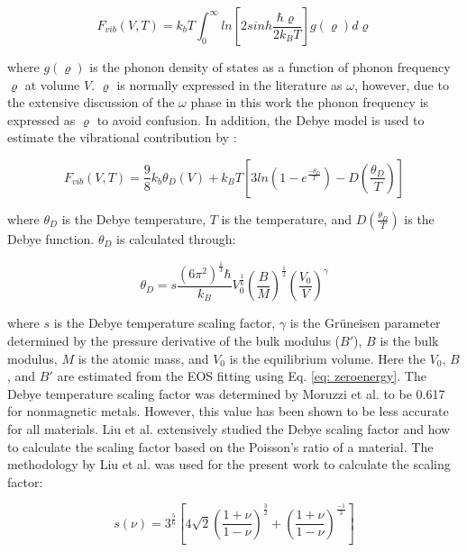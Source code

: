 \begin{equation}
\label{eq: phonon}
F_{vib}(V,T) = k_{b}T \int_{0}^{\infty} ln \left[ 2sinh \frac{\hbar \varrho}{2k_BT} \right] g(\varrho) d\varrho
\end{equation}

\noindent where $g(\varrho)$ is the phonon density of states as a function of phonon frequency $\varrho$ at volume $V$. $\varrho$ is normally expressed in the literature as $\omega$, however, due to the extensive discussion of the $\omega$ phase in this work the phonon frequency is expressed as $\varrho$ to avoid confusion. In addition, the Debye model is used to estimate the vibrational contribution by \cite{Shang2010}: 

\begin{equation}
\label{eq: debye}
F_{vib}(V,T) = \frac{9}{8} k_{b} \theta_{D}(V) + k_{B}T \left[ 3 ln \left( 1 - e^{\frac{-\theta_{D}}{T}} \right) - D \left( \frac{\theta_D}{T} \right) \right] 
\end{equation}

\noindent where $\theta_{D}$ is the Debye temperature, $T$ is the temperature, and $D \left( \frac{\theta_{D}}{T} \right) $ is the Debye function. $\theta_{D}$ is calculated through: 

\begin{equation}
\label{eq: debyetemp}
\theta_{D} = s \frac{(6\pi^2)^{\frac{1}{3}}\hbar}{k_B} V_{0}^{\frac{1}{6}} \left( \frac{B}{M} \right)^{\frac{1}{2}} \left( \frac{V_0}{V} \right)^{\gamma} 
\end{equation}

\noindent where $s$ is the Debye temperature scaling factor, $\gamma$ is the Gr\"uneisen parameter determined by the pressure derivative of the bulk modulus ($B'$), $B$ is the bulk modulus, $M$ is the atomic mass, and $V_0$ is the equilibrium volume. Here the $V_0$, $B$, and $B'$ are estimated from the EOS fitting using Eq. \ref{eq: zeroenergy}. The Debye temperature scaling factor was determined by Moruzzi et al. \cite{Moruzzi1988} to be 0.617 for nonmagnetic metals. However, this value has been shown to be less accurate for all materials. Liu et al. \cite{Liu2015} extensively studied the Debye scaling factor and how to calculate the scaling factor based on the Poisson's ratio of a material. The methodology by Liu et al. \cite{Liu2015} was used for the present work to calculate the scaling factor: 

\begin{equation}
\label{eq: debyescaling}
s(\nu) = 3^{\frac{5}{6}} \left[ 4\sqrt{2} \left( \frac{1 + \nu}{1 - \nu} \right)^{\frac{3}{2}} + \left( \frac{1 + \nu}{1 - \nu} \right)^{\frac{-1}{3}} \right]
\end{equation}

